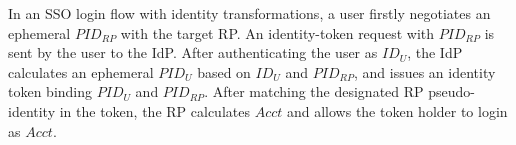 In an SSO login flow with identity transformations,
    a user firstly negotiates an ephemeral $PID_{RP}$ with the target RP.
An identity-token request with $PID_{RP}$ is sent by the user to the IdP.
After authenticating the user as $ID_U$, the IdP calculates an ephemeral $PID_U$ based on $ID_U$ and $PID_{RP}$,
    and issues an identity token binding $PID_U$ and $PID_{RP}$.
After matching the designated RP pseudo-identity in the token,
    the RP calculates $Acct$ and allows the token holder to login as $Acct$.




